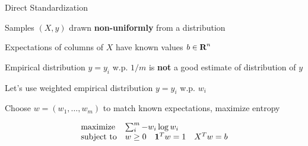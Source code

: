 \documentclass{beamer}
\begin{document}

\begin{frame}{Direct Standardization}
	\BIT
		\item Samples $(X,y)$ drawn \textbf{non-uniformly} from a distribution
		\item Expectations of columns of $X$ have known values $b \in {\mbox{\bf R}}^n$
		
		\pause
		\item Empirical distribution $y = y_i$ w.p. $1/m$ is \textbf{not} a good estimate of distribution of $y$
		\item Let's use weighted empirical distribution $y = y_i$ w.p. $w_i$
		\item Choose $w = (w_1,\ldots,w_m)$ to match known expectations, 
maximize entropy
	\EIT
	
	\[
	\begin{array}{ll} \mbox{maximize} & \sum_i^m -w_i \log w_i \\
	\mbox{subject to} & w \geq 0 \quad \mathbf 1^Tw = 1 \quad X^Tw = b
	\end{array}
	\]
\end{frame}
\end{document}
